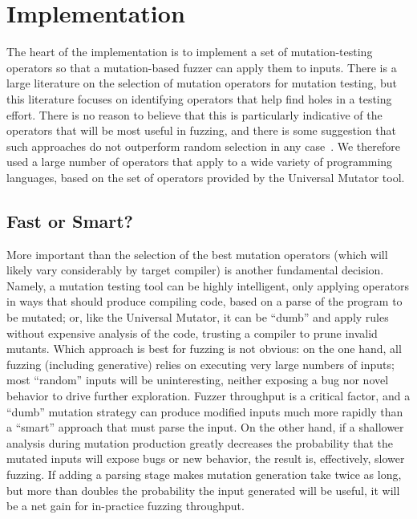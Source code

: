 \section{Implementation}
\label{implementation}

The heart of the implementation is to implement a set of mutation-testing operators
so that a mutation-based fuzzer can apply them to
inputs.  There is a large literature on the selection of mutation
operators for mutation testing, but this literature focuses on identifying
operators that help find holes in a testing effort.  There is no
reason to believe that this is particularly indicative of the
operators that will be most useful in fuzzing, and there is some
suggestion that such approaches do not outperform random selection in any case~\cite{MutReduct}.  We therefore 
used a large number of operators that apply to a wide variety of
programming languages, based on the set of operators provided by the
Universal Mutator tool.

\subsection{Fast or Smart?}

More important than the selection of the best mutation operators
(which will likely vary considerably by target compiler) is another
fundamental decision.  Namely, a mutation testing tool can be highly intelligent, only
applying operators in ways that should produce compiling code, based
on a parse of the program to be mutated; or, like the Universal
Mutator, it can be ``dumb'' and apply rules without expensive analysis
of the code, trusting a compiler to prune invalid
mutants.  Which approach is best for fuzzing is not obvious: on the
one hand, all fuzzing (including generative) relies on executing very
large numbers of inputs; most ``random'' inputs will be uninteresting,
neither exposing a bug nor novel behavior to drive further
exploration.  Fuzzer throughput is a critical factor, and a ``dumb''
mutation strategy can produce modified inputs much more rapidly than a
``smart'' approach that must parse the input.  On the other hand, if a
shallower analysis during mutation production greatly decreases the
probability that the mutated inputs will expose bugs or new behavior,
the result is, effectively, slower fuzzing.  If adding a parsing stage
makes mutation generation take twice as long, but more than doubles
the probability the input generated will be useful, it will be a net
gain for in-practice fuzzing throughput.

